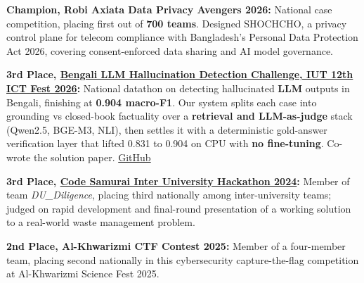\documentclass[a4paper,11pt]{article}
\begin{document}
\small{\item{

  \textbf{Champion, Robi Axiata Data Privacy Avengers 2026:}
  National case competition, placing first out of \textbf{700 teams}. Designed SHOCHCHO, a privacy control plane for telecom compliance with Bangladesh's Personal Data Protection Act 2026, covering consent-enforced data sharing and AI model governance. \\ \vspace{2pt}

  \textbf{3rd Place, \href{https://iutictfest26.tech/datathon}{Bengali LLM Hallucination Detection Challenge, IUT 12th ICT Fest 2026}:}
  National datathon on detecting hallucinated \textbf{LLM} outputs in Bengali, finishing at \textbf{0.904 macro-F1}. Our system splits each case into grounding vs closed-book factuality over a \textbf{retrieval and LLM-as-judge} stack (Qwen2.5, BGE-M3, NLI), then settles it with a deterministic gold-answer verification layer that lifted 0.831 to 0.904 on CPU with \textbf{no fine-tuning}. Co-wrote the solution paper. \href{https://github.com/AnindyaMaster42001/DU_RDANTO_Olikbochon_Onsite_Submission}{\color{blue}GitHub} \\ \vspace{2pt}

  \textbf{3rd Place, \href{https://www.codesamuraibd.net/}{Code Samurai Inter University Hackathon 2024}:}
  Member of team \textit{DU\_Diligence}, placing third nationally among inter-university teams; judged on rapid development and final-round presentation of a working solution to a real-world waste management problem. \\ \vspace{2pt}

  \textbf{2nd Place, Al-Khwarizmi CTF Contest 2025:}
  Member of a four-member team, placing second nationally in this cybersecurity capture-the-flag competition at Al-Khwarizmi Science Fest 2025. \\ \vspace{2pt}

}}
\end{document}
